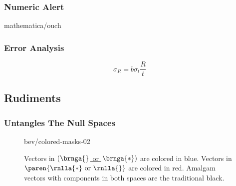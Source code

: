 \begin{frame}\frametitle{Numeric Alert}
\center
	\begin{overpic}[ scale = 0.375 ]
		{\pLocalGraphics mathematica/ouch}
	\end{overpic}
\end{frame}

%
\begin{frame}\frametitle{Error Analysis}
\begin{equation}
	\sigma_{R} = b \sigma_{t} \frac{R}{t}
\label{eq:error-powers}
\end{equation}
\end{frame}
%

\subsection{Rudiments}

%	

\begin{frame}\frametitle{\lsq Untangles The Null Spaces}
\begin{figure}[t]
\centering
	\begin{overpic}[ scale = 0.75 ]{\pLocalGraphics bev/colored-masks-02}
	\end{overpic}
\label{fig:Seeing the subspace decomposition}
\caption{Vectors in \href{https://mathworld.wolfram.com/ColumnSpace.html}{ $\left( \brnga{} \right.$ or $\left. \brnga{*}\right)$} are colored in blue. Vectors in \href{https://mathworld.wolfram.com/NullSpace.html}{ $\paren{\rnlla{*} \text{ or } \rnlla{}}$} are colored in red. Amalgam vectors with components in both spaces are the traditional black.}
\end{figure}
\end{frame}

	
		
	


\endinput  %
